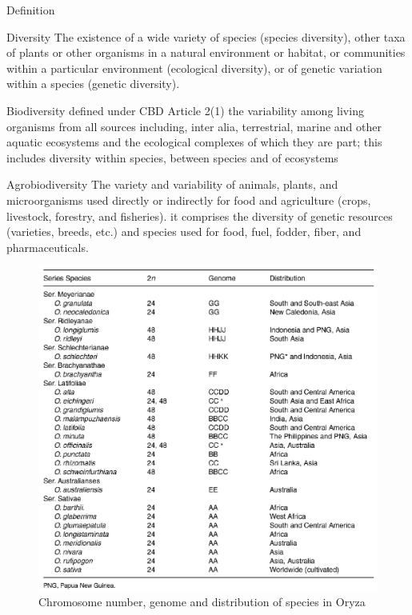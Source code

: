 \documentclass[
  ignorenonframetext,
  aspectratio=169]{beamer}
\begin{document}
\begin{frame}{Definition}
\protect\hypertarget{definition}{}
\begin{block}{Diversity}
\footnotesize
The existence of a wide variety of species (species diversity), other taxa of plants or other organisms in a natural environment or habitat, or communities within a particular environment (ecological diversity), or of genetic variation within a species (genetic diversity).
\end{block}

\begin{block}{Biodiversity defined under CBD Article 2(1)}
\footnotesize
the variability among living organisms from all sources including, inter alia, terrestrial, marine and other aquatic ecosystems and the ecological complexes of which they are part; this includes diversity within species, between species and of ecosystems
\end{block}

\begin{block}{Agrobiodiversity}
\footnotesize
The variety and variability of animals, plants, and microorganisms used directly or indirectly for food and agriculture (crops, livestock, forestry, and fisheries). it comprises the diversity of genetic resources (varieties, breeds, etc.) and species used for food, fuel, fodder, fiber, and pharmaceuticals.
\end{block}
\end{frame}

\begin{frame}{}
\protect\hypertarget{section-5}{}
\begin{figure}
\includegraphics[width=0.5\linewidth]{./../images/oryza_distribution_chromosome} \caption{Chromosome number, genome and distribution of species in Oryza}\label{fig:chromosome-distribution-oryza}
\end{figure}
\end{frame}
\end{document}
